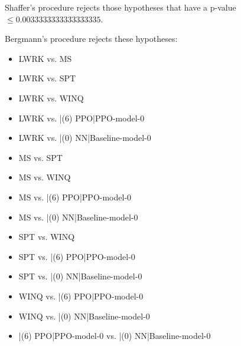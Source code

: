 \documentclass[a3paper,10pt]{article}
\begin{document}
Shaffer's procedure rejects those hypotheses that have a p-value $\le0.0033333333333333335$.


Bergmann's procedure rejects these hypotheses:


\begin{itemize}


\item LWRK vs. MS
\item LWRK vs. SPT
\item LWRK vs. WINQ
\item LWRK vs. |(6) PPO|PPO-model-0
\item LWRK vs. |(0) NN|Baseline-model-0
\item MS vs. SPT
\item MS vs. WINQ
\item MS vs. |(6) PPO|PPO-model-0
\item MS vs. |(0) NN|Baseline-model-0
\item SPT vs. WINQ
\item SPT vs. |(6) PPO|PPO-model-0
\item SPT vs. |(0) NN|Baseline-model-0
\item WINQ vs. |(6) PPO|PPO-model-0
\item WINQ vs. |(0) NN|Baseline-model-0
\item |(6) PPO|PPO-model-0 vs. |(0) NN|Baseline-model-0
\end{itemize}
\end{document}
